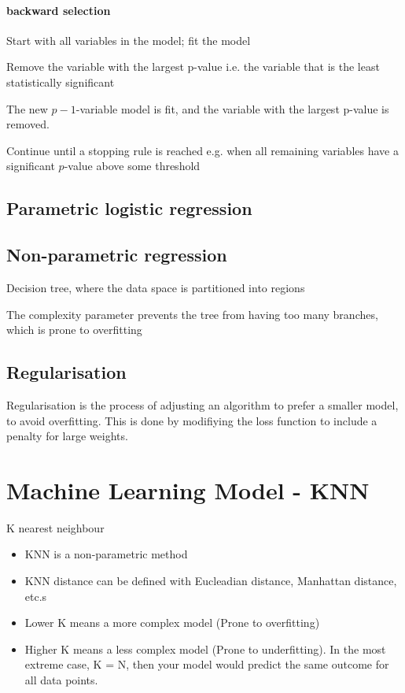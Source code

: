 \documentclass[12pt,a4paper]{article}
\begin{document}
\paragraph{backward selection}

Start with all variables in the model; fit the model

Remove the variable with the largest p-value i.e. the variable that is the least statistically significant

The new $p-1$-variable model is fit, and the variable with the largest p-value is removed.

Continue until a stopping rule is reached e.g. when all remaining variables have a significant $p$-value above some threshold
\subsection{Parametric logistic regression}
\subsection{Non-parametric regression}
Decision tree, where the data space is partitioned into regions

The complexity parameter prevents the tree from having too many branches, which is prone to overfitting
\subsection{Regularisation}
Regularisation is the process of adjusting an algorithm to prefer a smaller model, to avoid overfitting. This is done by modifiying the loss function to include a penalty for large weights.


\section{Machine Learning Model - KNN}
K nearest neighbour
\begin{itemize}
    \item KNN is a non-parametric method
    \item KNN distance can be defined with Eucleadian distance, Manhattan distance, etc.s
    \item Lower K means a more complex model (Prone to overfitting)
    \item Higher K means a less complex model (Prone to underfitting). 
    In the most extreme case, K = N, then your model would predict the same outcome for all data points.
\end{itemize}
\end{document}
